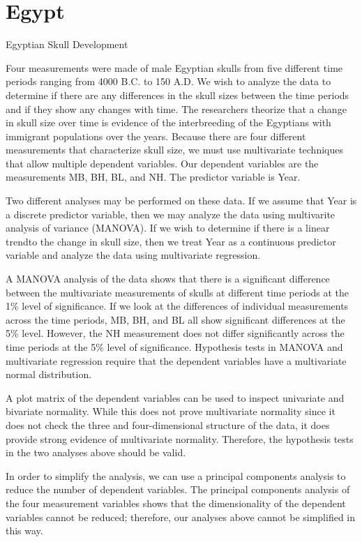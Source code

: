 \documentclass[11pt]{article} %
\begin{document}
\newpage

\section{Egypt}

Egyptian Skull Development


\bigskip


 Four measurements were made of male Egyptian skulls from five different time periods ranging from 4000 B.C. to 150 A.D. We wish to analyze the data to determine if there are any differences in the skull sizes between the time periods and if they show any changes with time. The researchers theorize that a change in skull size over time is evidence of the interbreeding of the Egyptians with immigrant populations over the years.
Because there are four different measurements that characterize skull size, we must use multivariate techniques that allow multiple dependent variables. Our dependent variables are the measurements MB, BH, BL, and NH. The predictor variable is Year.


\bigskip


Two different analyses may be performed on these data. If we assume that Year is a discrete predictor variable, then we may analyze the data using multivarite analysis of variance (MANOVA). If we wish to determine if there is a linear trendto the change in skull size, then we treat Year as a continuous predictor variable and analyze the data using multivariate regression.


\bigskip


A MANOVA analysis of the data shows that there is a significant difference between the multivariate measurements of skulls at different time periods at the 1\% level of significance. If we look at the differences of individual measurements across the time periods, MB, BH, and BL all show significant differences at the 5\% level. However, the NH measurement does not differ significantly across the time periods at the 5\% level of significance.
Hypothesis tests in MANOVA and multivariate regression require that the dependent variables have a multivariate normal distribution. 


\bigskip


A plot matrix of the dependent variables can be used to inspect univariate and bivariate normality. While this does not prove multivariate normality since it does not check the three and four-dimensional structure of the data, it does provide strong evidence of multivariate normality. Therefore, the hypothesis tests in the two analyses above should be valid.


\bigskip


In order to simplify the analysis, we can use a principal components analysis to reduce the number of dependent variables. The principal components analysis of the four measurement variables shows that the dimensionality of the dependent variables cannot be reduced; therefore, our analyses above cannot be simplified in this way.
\end{document}
